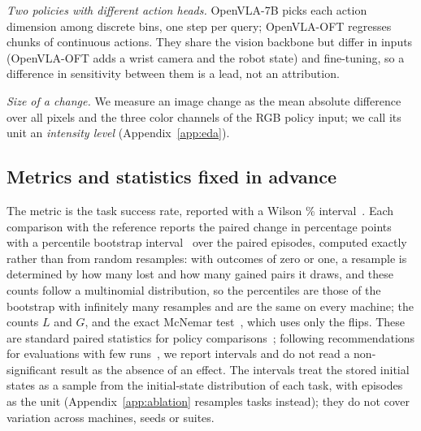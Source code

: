 \emph{Two policies with different action heads.} OpenVLA-7B picks each action dimension among \Bins{} discrete bins, one step per query; OpenVLA-OFT regresses chunks of \Chunk{} continuous actions. They share the vision backbone but differ in inputs (OpenVLA-OFT adds a wrist camera and the robot state) and fine-tuning, so a difference in sensitivity between them is a lead, not an attribution.

\emph{Size of a change.} We measure an image change as the mean absolute difference over all pixels and the three color channels of the RGB policy input; we call its unit an \emph{intensity level} (Appendix~\ref{app:eda}).

\subsection{Metrics and statistics fixed in advance}
\label{sec:stats}

The metric is the task success rate, reported with a Wilson \AlphaPct\% interval~\citep{wilson1927}. Each comparison with the reference reports the paired change in percentage points with a percentile bootstrap interval~\citep{efron1979} over the paired episodes, computed exactly rather than from random resamples: with outcomes of zero or one, a resample is determined by how many lost and how many gained pairs it draws, and these counts follow a multinomial distribution, so the percentiles are those of the bootstrap with infinitely many resamples and are the same on every machine; the counts $L$ and $G$, and the exact McNemar test~\citep{mcnemar1947}, which uses only the flips. These are standard paired statistics for policy comparisons~\citep{li2026paraphrase}; following recommendations for evaluations with few runs~\citep{agarwal2021,kressgazit2024}, we report intervals and do not read a non-significant result as the absence of an effect. The intervals treat the stored initial states as a sample from the initial-state distribution of each task, with episodes as the unit (Appendix~\ref{app:ablation} resamples tasks instead); they do not cover variation across machines, seeds or suites.

